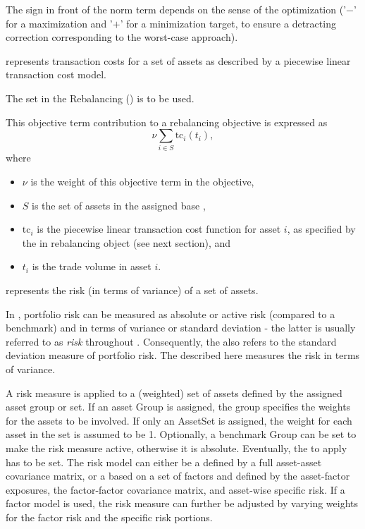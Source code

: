 		The sign in front of the norm term depends on the sense of the optimization 
      ('$-$' for a maximization and '$+$' for a minimization target, 
      to ensure a detracting correction corresponding to the worst-case approach). 


      represents transaction costs for a set of assets as described by a piecewise linear transaction cost model. 

      The  set in the Rebalancing () is to be used.

      This objective term contribution to a rebalancing objective is expressed as 
      \[ 
         \nu\sum_{i\in S}\text{tc}_i(t_i),
      \]
      where
      \begin{itemize}
			\item $\nu$ is the weight of this objective term in the objective, 
			\item $S$ is the set of assets in the assigned base , 
			\item $\text{tc}_i$ is the piecewise linear transaction cost function for asset $i$, 
               as specified by the  in rebalancing object (see next section), and 
         \item	$t_i$ is the trade volume in asset $i$. 
      \end{itemize}

		represents the risk (in terms of variance) of a set of assets. 
		
		In \axioma{}, portfolio risk can be measured as absolute or active risk (compared to a benchmark) 
      and in terms of variance or standard deviation - the latter is usually referred to as \emph{risk} throughout \axioma{}.
      Consequently, the  also refers to the standard deviation measure of portfolio risk. 
      The  described here measures the risk in terms of variance. 
		
		A risk measure is applied to a (weighted) set of assets defined by the assigned asset group or set. 
      If an asset Group is assigned, the group specifies the weights for the assets to be involved. 
      If only an AssetSet is assigned, the weight for each asset in the set is assumed to be 1. 
      Optionally, a benchmark Group can be set to make the risk measure active, otherwise it is absolute. 
      Eventually, the  to apply has to be set. 
      The risk model can either be a  defined by a full asset-asset covariance matrix, 
      or a  based on a set of factors and defined by the asset-factor exposures, 
      the factor-factor covariance matrix, and asset-wise specific risk. 
      If a factor model is used, the risk measure can further be adjusted by varying weights for the factor risk and the specific risk portions. 
		
